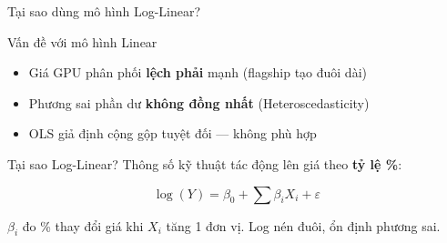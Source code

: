 \documentclass[13pt, aspectratio=169]{beamer}
\begin{document}
\begin{frame}{Tại sao dùng mô hình Log-Linear?}
  \begin{block}{Vấn đề với mô hình Linear}
    \footnotesize
    \begin{itemize}
      \item Giá GPU phân phối \textbf{lệch phải} mạnh (flagship tạo đuôi dài)
      \item Phương sai phần dư \textbf{không đồng nhất} (Heteroscedasticity)
      \item OLS giả định cộng gộp tuyệt đối --- không phù hợp
    \end{itemize}
  \end{block}
  \begin{exampleblock}{Tại sao Log-Linear?}
    \footnotesize Thông số kỹ thuật tác động lên giá theo \textbf{tỷ lệ \%}:
    \vspace{0.1em}

    \[\log(Y) = \beta_0 + \sum \beta_i X_i + \varepsilon\]

    $\beta_i$ đo \% thay đổi giá khi $X_i$ tăng 1 đơn vị. Log nén đuôi, ổn định phương sai.
  \end{exampleblock}
\end{frame}
\end{document}
